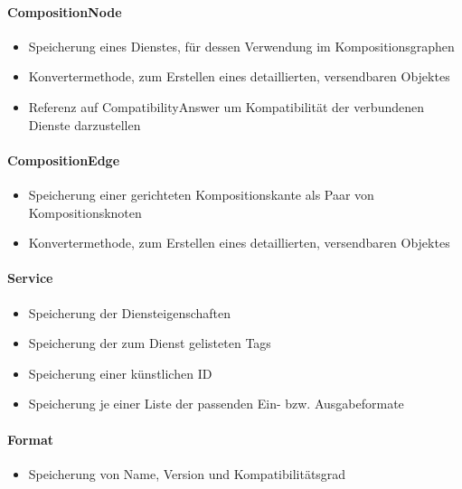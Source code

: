\paragraph{CompositionNode}
\begin{itemize}
	\item Speicherung eines Dienstes, für dessen Verwendung im Kompositionsgraphen
	\item Konvertermethode, zum Erstellen eines detaillierten, versendbaren Objektes
	\item Referenz auf CompatibilityAnswer um Kompatibilität der verbundenen Dienste darzustellen
\end{itemize} 
\paragraph{CompositionEdge} 
\begin{itemize}
	\item Speicherung einer gerichteten Kompositionskante als Paar von Kompositionsknoten
	\item Konvertermethode, zum Erstellen eines detaillierten, versendbaren Objektes
\end{itemize}

\paragraph{Service}
\begin{itemize}
	\item Speicherung der Diensteigenschaften
	\item Speicherung der zum Dienst gelisteten Tags
	\item Speicherung einer künstlichen ID
	\item Speicherung je einer Liste der passenden Ein- bzw. Ausgabeformate
\end{itemize} 
\paragraph{Format}
\begin{itemize}
	\item Speicherung von Name, Version und Kompatibilitätsgrad
\end{itemize} 

